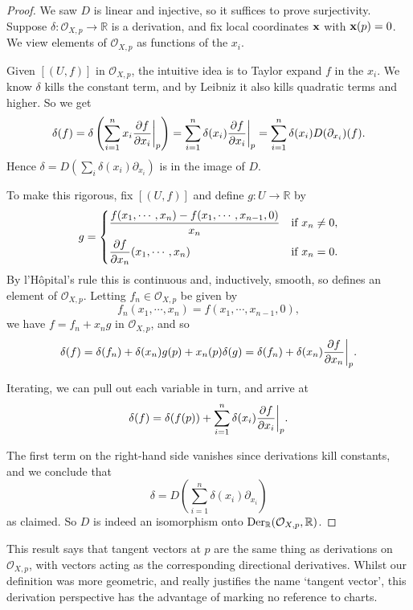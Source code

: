 \documentclass[a4paper,11pt]{article}
\begin{document}
	\begin{proof}
		We saw $D$ is linear and injective, so it suffices to prove surjectivity. Suppose $\delta : \mathcal{O}_{X,p} \to \mathbb{R}$ is a derivation, and fix local coordinates $\vb x$ with $\vb x(p) = 0$. We view elements of $\mathcal{O}_{X,p}$ as functions of the $x_i$.

		Given $[(U,f)]$ in $\mathcal{O}_{X,p}$, the intuitive idea is to Taylor expand $f$ in the $x_i$. We know $\delta$ kills the constant term, and by Leibniz it also kills quadratic terms and higher. So we get
		\[
			\delta(f) = \delta \left( \sum_{i = 1}^n x_i \pdv{f}{x_i}\bigg|_{p} \right) = \sum_{i=1}^n \delta(x_i) \pdv{f}{x_i}\bigg|_{p} = \sum_{i=1}^n \delta(x_i) D(\partial_{x_i})(f).
		\]
		Hence $\delta = D(\sum_i \delta(x_i) \partial_{x_i})$ is in the image of $D$.

		To make this rigorous, fix $[(U,f)]$ and define $g : U \to \mathbb{R}$ by
		\[
			g = \begin{dcases}
				\frac{f(x_1,\cdots,x_n) - f(x_1,\cdots,x_{n-1},0)}{x_n} & \text{if }x_n \neq 0,\\
				\pdv{f}{x_n}\/(x_1, \cdots, x_n) & \text{if }x_n = 0.
			\end{dcases}
		\]
		By l'H\^opital's rule this is continuous and, inductively, smooth, so defines an element of $\mathcal{O}_{X,p}$. Letting $f_n \in \mathcal{O}_{X,p}$ be given by
		\[
			f_n (x_1, \cdots, x_n) = f(x_1, \cdots, x_{n-1}, 0),
		\]
		we have $f = f_n + x_n g$ in $\mathcal{O}_{X,p}$, and so
		\[
			\delta(f) = \delta (f_n) + \delta (x_n) g(p) + x_n (p) \delta (g) = \delta(f_n) + \delta(x_n) \pdv{f}{x_n}\bigg|_{p}.
		\]

		Iterating, we can pull out each variable in turn, and arrive at
		\[
			\delta(f) = \delta(f(p)) + \sum_{i = 1}^n \delta(x_i) \pdv{f}{x_i}\bigg|_{p}.
		\]
		
		The first term on the right-hand side vanishes since derivations kill constants, and we conclude that
		\[
			\delta = D \left( \sum_{i = 1}^n \delta(x_i) \partial_{x_i} \right)
		\]
		as claimed. So $D$ is indeed an isomorphism onto $\operatorname{Der}_{\mathbb{R}}(\mathcal{O}_{X,p},\mathbb{R})$.
	\end{proof}

	This result says that tangent vectors at $p$ are the same thing as derivations on $\mathcal{O}_{X,p}$, with vectors acting as the corresponding directional derivatives. Whilst our definition was more geometric, and really justifies the name `tangent vector', this derivation perspective has the advantage of marking no reference to charts.
\end{document}
